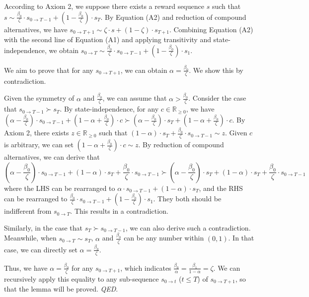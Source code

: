 \documentclass[
  12pt,
]{article}
\begin{document}
According to Axiom 2, we suppose there exists a reward sequence \(s\)
such that
\(s \sim \frac{\beta_0}{\zeta}\cdot s_{0 \rightarrow T-1} + (1-\frac{\beta_0}{\zeta})\cdot s_T\).
By Equation (A2) and reduction of compound alternatives, we have
\(s_{0\rightarrow T+1}\sim \zeta \cdot s + (1-\zeta)\cdot s_{T+1}\).
Combining Equation (A2) with the second line of Equation (A1) and
applying transitivity and state-independence, we obtain
\(s_{0\rightarrow T} \sim \frac{\beta_0}{\zeta}\cdot s_{0 \rightarrow T-1} + (1-\frac{\beta_0}{\zeta})\cdot s_1\).

We aim to prove that for any \(s_{0\rightarrow T+1}\), we can obtain
\(\alpha=\frac{\beta_0}{\zeta}\). We show this by contradiction.

Given the symmetry of \(\alpha\) and \(\frac{\beta_0}{\zeta}\), we can
assume that \(\alpha > \frac{\beta_0}{\zeta}\). Consider the case that
\(s_{0 \rightarrow T-1} \succ s_T\). By state-independence, for any
\(c\in \mathbb{R}_{\geq 0}\), we have
\((\alpha - \frac{\beta_0}{\zeta})\cdot s_{0\rightarrow T-1} + (1-\alpha+\frac{\beta_0}{\zeta})\cdot c \succ (\alpha - \frac{\beta_0}{\zeta})\cdot s_T + (1-\alpha+\frac{\beta_0}{\zeta})\cdot c\).
By Axiom 2, there exists \(z\in \mathbb{R}_{\geq 0}\) such that
\((1-\alpha)\cdot s_T + \frac{\beta_0}{\zeta}\cdot s_{0\rightarrow T-1}\sim z\).
Given \(c\) is arbitrary, we can set
\((1-\alpha+\frac{\beta_0}{\zeta})\cdot c \sim z\). By reduction of
compound alternatives, we can derive that\[
(\alpha-\frac{\beta_0}{\zeta})\cdot s_{0\rightarrow T-1} +(1-\alpha)\cdot s_T + \frac{\beta_0}{\zeta}\cdot s_{0\rightarrow T-1} \succ (\alpha-\frac{\beta_0}{\zeta})\cdot s_T +(1-\alpha)\cdot s_T + \frac{\beta_0}{\zeta}\cdot s_{0\rightarrow T-1}
\]where the LHS can be rearranged to
\(\alpha\cdot s_{0\rightarrow T-1} + (1-\alpha)\cdot s_T\), and the RHS
can be rearranged to
\(\frac{\beta_0}{\zeta}\cdot s_{0 \rightarrow T-1} + (1-\frac{\beta_0}{\zeta})\cdot s_1\).
They both should be indifferent from \(s_{0\rightarrow T}\). This
results in a contradiction.

Similarly, in the case that \(s_T \succ s_{0 \rightarrow T-1}\), we can
also derive such a contradiction. Meanwhile, when
\(s_{0\rightarrow T}\sim s_T\), \(\alpha\) and \(\frac{\beta_0}{\zeta}\)
can be any number within \((0,1)\). In that case, we can directly set
\(\alpha = \frac{\beta_0}{\zeta}\).

Thus, we have \(\alpha = \frac{\beta_0}{\zeta}\) for any
\(s_{0\rightarrow T+1}\), which indicates
\(\frac{\beta_0}{\alpha}=\frac{\beta_1}{1-\alpha}=\zeta\). We can
recursively apply this equality to any sub-sequence
\(s_{0\rightarrow t}\) (\(t\leq T\)) of \(s_{0\rightarrow T+1}\), so
that the lemma will be proved. \emph{QED}.
\end{document}
